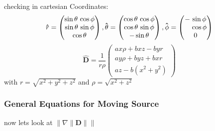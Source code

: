 checking in cartesian Coordinates:
\begin{equation}
	\mathbf{\hat{\text{${r}$}}} =
	\begin{pmatrix}
		\sin\theta \, \cos\phi \\
		\sin\theta \, \sin\phi \\
		\cos\theta            \\
	\end{pmatrix},
	\mathbf{\hat{\text{$\theta$}}} =
	\begin{pmatrix}
		\cos\theta \, \cos\phi \\
		\cos\theta \, \sin\phi \\
		-\sin\theta            \\
	\end{pmatrix},
	\mathbf{\hat{\text{$\phi$}}} =
	\begin{pmatrix}
		-\, \sin\phi             \\
		\hphantom{-} \, \cos\phi \\
		0                        \\
	\end{pmatrix}
\end{equation}
\begin{equation}
	\mathbf{\hat{\text{${D}$}}} = \frac{1}{r\rho}
	\begin{pmatrix}
		ax\rho +bxz - byr  \\
		ay\rho + byz + bxr \\
		az - b(x^2+y^2)
	\end{pmatrix}
\end{equation}
with $r=\sqrt{x^2+y^2+z^2}$ and $\rho=\sqrt{x^2+z^2}$

\subsubsection{General Equations for Moving Source}\label{subsubsect: General Equations for Moving Source 2}

now lets look at $\big\| \nabla \|\mathbf{D}\| \big\|$


